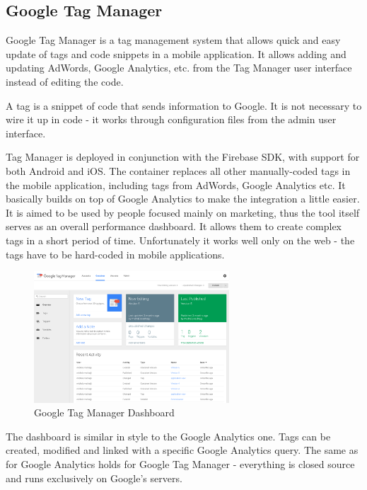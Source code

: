 \subsection{Google Tag Manager}

Google Tag Manager is a tag management system that allows quick and easy update of tags and code snippets in a mobile application. It allows adding and updating AdWords, Google Analytics, etc. from the Tag Manager user interface instead of editing the code.

A tag is a snippet of code that sends information to Google. It is not necessary to wire it up in code - it works through configuration files from the admin user interface.

Tag Manager is deployed in conjunction with the Firebase SDK, with support for both Android and iOS. The container replaces all other manually-coded tags in the mobile application, including tags from AdWords, Google Analytics etc. It basically builds on top of Google Analytics to make the integration a little easier. It is aimed to be used by people focused mainly on marketing, thus the tool itself serves as an overall performance dashboard. It allows them to create complex tags in a short period of time. Unfortunately it works well only on the web - the tags have to be hard-coded in mobile applications.

\newpage

\begin{figure}[!ht]
	\centering
	\includegraphics[width=0.65\textwidth]{figures/02_analysis/tagmanager}
    \caption{Google Tag Manager Dashboard}
\end{figure}

The dashboard is similar in style to the Google Analytics one. Tags can be created, modified and linked with a specific Google Analytics query. The same as for Google Analytics holds for Google Tag Manager - everything is closed source and runs exclusively on Google's servers.

